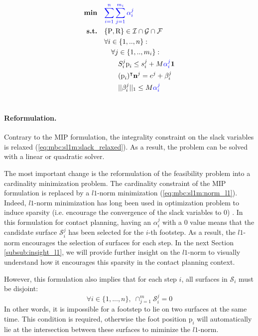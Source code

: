 \begin{align}
    \textrm{\textbf{min}}  \quad & \textcolor{blue}{\sum_{i=1}^{n} \sum_{j=1}^{m_i} \alpha_i^j} \label{eq:mbc:sl1m:norm_l1}\\
    \textrm{\textbf{s.t.}}  \quad & \{\mbox{P},\mbox{R}\} \in \mathcal{I} \cap \mathcal{G} \cap \mathcal{F} \nonumber\\
                            \quad & \forall i \in \{1,..,n\} : \nonumber\\
                                \quad & \quad \forall j \in \{1,..,m_i\} : \nonumber\\
                                    \quad & \quad \quad S_i^j\mbox{p}_i \leq s_i^j + M \textcolor{blue}{\alpha_i^j} \textbf{1} \nonumber\\
                                    \quad & \quad \quad (\mbox{p}_i)^{\intercal} \textbf{n}^j = e^j + \beta_i^j \nonumber\\
                                    \quad & \quad \quad ||\beta_i^j||_1 \leq M \textcolor{blue}{\alpha_i^j} \nonumber\\
                                    \nonumber
\end{align}
\paragraph{Reformulation.}
Contrary to the MIP formulation, the integrality constraint on the slack variables is relaxed (\ref{eq:mbc:sl1m:slack_relaxed}). 
As a result, the problem can be solved with a linear or quadratic solver.

The most important change is the reformulation of the feasibility problem into a cardinality minimization problem. The cardinality constraint of the MIP formulation is replaced by a $l1$-norm minimization (\ref{eq:mbc:sl1m:norm_l1}).
Indeed, $l1$-norm minimization has long been used in optimization problem to induce sparsity (i.e. encourage the convergence of the slack variables to 0) \cite{boyd2004convex}. 
In this formulation for contact planning, having an $\alpha_i^j$ with a 0 value means that the candidate surface $\mathcal{S}_i^j$ has been selected for the $i$-th footstep. 
As a result, the $l1$-norm encourages the selection of surfaces for each step.
In the next Section \ref{subsub:insight_l1}, we will provide further insight on the $l1$-norm to visually understand how it encourages this sparsity in the contact planning context.

However, this formulation also implies that for each step $i$, all surfaces in $\mathcal{S}_i$ must be disjoint:
\begin{equation}
    \forall i \in \{1,...,n\},\; \cap^m_{j=1} \mathcal{S}^j_i = 0
\end{equation}
In other words, it is impossible for a footstep to lie on two surfaces at the same time. This condition is required, otherwise the foot position $\mbox{p}_i$ will automatically lie at the intersection between these surfaces to miminize the $l1$-norm.


